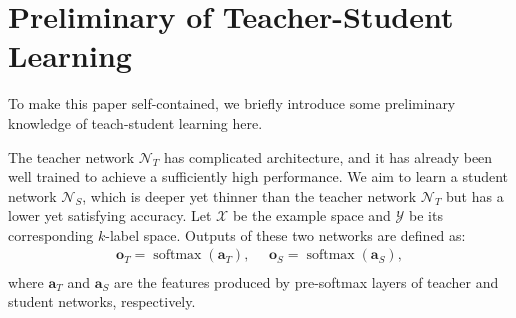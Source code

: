 \documentclass[journal]{IEEEtran}
\DeclareMathOperator{\softmax}{softmax}
\newcommand{\bo}{\bm{o}}
\newcommand{\ba}{\bm{a}}
\begin{document}
\section{Preliminary of Teacher-Student Learning}
To make this paper self-contained, we briefly introduce some preliminary knowledge of teach-student learning here.

The teacher network $\mathcal N_T$ has complicated architecture, and it has already been well trained to achieve a sufficiently high performance. We aim to learn a student network $\mathcal N_S$, which is deeper yet thinner than the teacher network $\mathcal N_T$ but has a lower yet satisfying accuracy. Let $\mathcal X$ be the example space and $\mathcal Y$ be its corresponding $k$-label space. Outputs of these two networks are defined as: 
\begin{equation}
\begin{aligned}
\bo_T = \softmax(\ba_T),\ \ \ \ \ \ \bo_S = \softmax(\ba_S), \\
\end{aligned}
\label{eq:softmax}
\end{equation}
where $\ba_T$ and $\ba_S$ are the features produced by pre-softmax layers of teacher and student networks, respectively.
\end{document}
